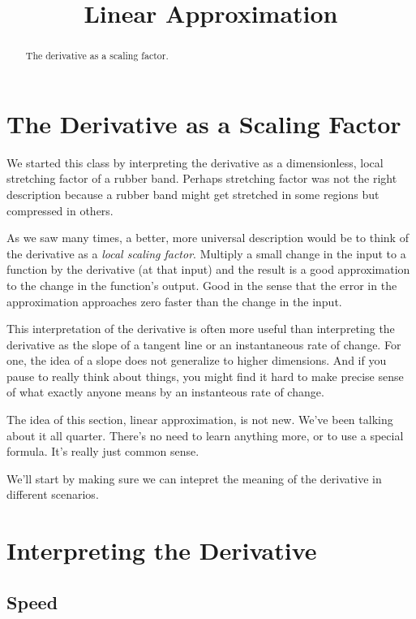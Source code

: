 \documentclass{ximera}
\title{Linear Approximation}
\begin{document}
\begin{abstract}
The derivative as a scaling factor.
\end{abstract}
\maketitle


\section{The Derivative as a Scaling Factor}

We started this class by interpreting the derivative as a dimensionless, local stretching factor of a rubber band. Perhaps stretching factor was not the right description because a rubber band might get stretched in some regions but compressed in others. 

As we saw many times, a better, more universal description would be to think of the derivative as a \emph{local scaling factor}. Multiply a small change in the input to a function by the derivative (at that input) and the result is a good approximation to the change in the function's output. Good in the sense that the error in the approximation approaches zero faster than the change in the input.

This interpretation of the derivative is often more useful than interpreting the derivative as the slope of a tangent line or an instantaneous rate of change. For one, the idea of a slope does not generalize to higher dimensions. And if you pause to really think about things, you might find it hard to make precise sense of what exactly anyone means by an instanteous rate of change. 

The idea of this section, linear approximation, is not new. We've been talking about it all quarter. There's no need to learn anything more, or to use a special formula. It's really just common sense. 

We'll start by making sure we can intepret the meaning of the derivative in different scenarios.%


\section{Interpreting the Derivative}

\subsection{Speed}
\end{document}
